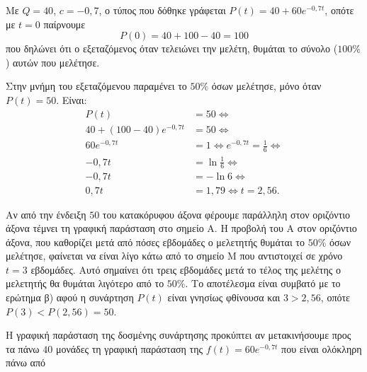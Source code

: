 \documentclass[11pt,a4paper,twoside]{book}
\begin{document}
\begin{alist}
\item Με $Q=40$, $c=-0{,}7$, ο τύπος που δόθηκε γράφεται $P(t) = 40 + 60e^{-0{,}7t}$, οπότε με $t=0$ παίρνουμε
\[P(0) = 40 + 100 - 40 = 100\]
που δηλώνει ότι ο εξεταζόμενος όταν τελειώνει την μελέτη, θυμάται το σύνολο ($100\%$) αυτών που μελέτησε.
\item Στην μνήμη του εξεταζόμενου παραμένει το $50\%$ όσων μελέτησε, μόνο όταν $P(t) = 50$. Είναι:
\begin{align*}
P(t) &= 50 \Leftrightarrow \\
40 + (100 - 40)e^{-0{,}7t} &= 50 \Leftrightarrow \\
60e^{-0{,}7t} &= 1 \Leftrightarrow e^{-0{,}7t} = \frac{1}{6} \Leftrightarrow \\
-0{,}7t &= \ln\frac{1}{6} \Leftrightarrow \\
-0{,}7t &= -\ln 6 \Leftrightarrow \\
0{,}7t &= 1{,}79 \Leftrightarrow t = 2{,}56.
\end{align*}
\item Αν από την ένδειξη $50$ του κατακόρυφου άξονα φέρουμε παράλληλη στον οριζόντιο άξονα τέμνει τη γραφική παράσταση στο σημείο $\text{A}$. Η προβολή του $\text{A}$ στον οριζόντιο άξονα, που καθορίζει μετά από πόσες εβδομάδες ο μελετητής θυμάται το $50\%$ όσων μελέτησε, φαίνεται να είναι λίγο κάτω από το σημείο $\text{M}$ που αντιστοιχεί σε χρόνο $t=3$ εβδομάδες. Αυτό σημαίνει ότι τρεις εβδομάδες μετά το τέλος της μελέτης ο μελετητής θα θυμάται λιγότερο από το $50\%$. Το αποτέλεσμα είναι συμβατό με το ερώτημα β) αφού η συνάρτηση $P(t)$ είναι γνησίως φθίνουσα και $3 > 2{,}56$, οπότε $P(3) < P(2{,}56) = 50$.
\begin{center}
\end{center}
\item Η γραφική παράσταση της δοσμένης συνάρτησης προκύπτει αν μετακινήσουμε προς τα πάνω $40$ μονάδες τη γραφική παράσταση της $f(t) = 60e^{-0{,}7t}$ που είναι ολόκληρη πάνω από
\end{alist}
\end{document}
